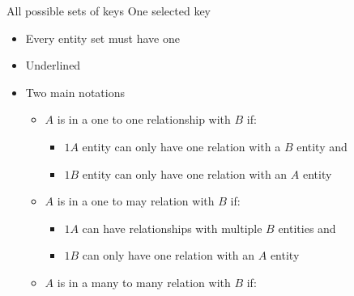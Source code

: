 \begin{itemize}
\begin{description}
\begin{description}
                     All possible sets of keys
                     One selected key
                        \begin{itemize}
                            \item Every entity set must have one
                            \item Underlined
                        \end{itemize}
                \end{description}
        \end{description}
        \begin{itemize}
            \item Two main notations
            \begin{description}
                    \begin{itemize}
                        \item $A$ is in a one to one relationship with $B$ if:
                            \begin{itemize}
                                \item $1 A$ entity can only have one relation with a $B$ entity and
                                \item $1 B$ entity can only have one relation with an $A$ entity
                            \end{itemize}
                    \end{itemize}
                    \begin{itemize}
                        \item $A$ is in a one to may relation with $B$ if:
                            \begin{itemize}
                                \item $1 A$ can have relationships with multiple $B$ entities and
                                \item $1 B$ can only have one relation with an $A$ entity
                            \end{itemize}
                    \end{itemize}
                    \begin{itemize}
                        \item $A$ is in a many to many relation with $B$ if:

\end{itemize}
\end{description}
\end{itemize}
\end{itemize}
